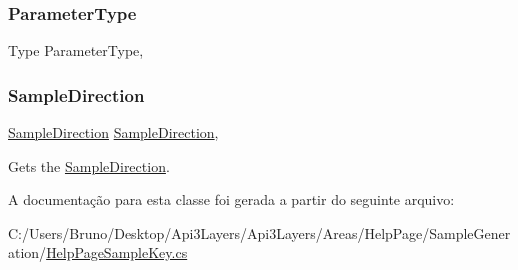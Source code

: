 \subsubsection{\texorpdfstring{Parameter\+Type}{ParameterType}}
{\footnotesize\ttfamily Type Parameter\+Type\hspace{0.3cm}{\ttfamily [get]}, {}}

\mbox{\label{classApi3Layers_1_1Areas_1_1HelpPage_1_1HelpPageSampleKey_a7f001c7cd8d8d35bc4613b02ca9d639c}} 
\subsubsection{\texorpdfstring{Sample\+Direction}{SampleDirection}}
{\footnotesize\ttfamily \hyperlink{namespaceApi3Layers_1_1Areas_1_1HelpPage_abad9f6d2b059d72558bf70415efc32b5}{Sample\+Direction} \hyperlink{namespaceApi3Layers_1_1Areas_1_1HelpPage_abad9f6d2b059d72558bf70415efc32b5}{Sample\+Direction}\hspace{0.3cm}{\ttfamily [get]}, {}}



Gets the \hyperlink{classApi3Layers_1_1Areas_1_1HelpPage_1_1HelpPageSampleKey_a7f001c7cd8d8d35bc4613b02ca9d639c}{Sample\+Direction}. 



A documentação para esta classe foi gerada a partir do seguinte arquivo\+:\begin{DoxyCompactItemize}
\item 
C\+:/\+Users/\+Bruno/\+Desktop/\+Api3\+Layers/\+Api3\+Layers/\+Areas/\+Help\+Page/\+Sample\+Generation/\hyperlink{HelpPageSampleKey_8cs}{Help\+Page\+Sample\+Key.\+cs}\end{DoxyCompactItemize}
